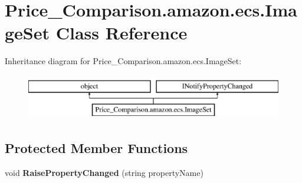\hypertarget{class_price___comparison_1_1amazon_1_1ecs_1_1_image_set}{\section{Price\-\_\-\-Comparison.\-amazon.\-ecs.\-Image\-Set Class Reference}
\label{class_price___comparison_1_1amazon_1_1ecs_1_1_image_set}
}


 


Inheritance diagram for Price\-\_\-\-Comparison.\-amazon.\-ecs.\-Image\-Set\-:\begin{figure}[H]
\begin{center}
\leavevmode
\includegraphics[height=2.000000cm]{class_price___comparison_1_1amazon_1_1ecs_1_1_image_set}
\end{center}
\end{figure}
\subsection*{Protected Member Functions}
\begin{DoxyCompactItemize}
\item 
\hypertarget{class_price___comparison_1_1amazon_1_1ecs_1_1_image_set_ad9798d2335283df6280728e6de8cbe5a}{void {\bfseries Raise\-Property\-Changed} (string property\-Name)}\label{class_price___comparison_1_1amazon_1_1ecs_1_1_image_set_ad9798d2335283df6280728e6de8cbe5a}

\end{DoxyCompactItemize}
